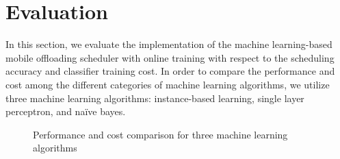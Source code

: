 \documentclass[10pt, conference, compsocconf]{IEEEtran}
\begin{document}
{\section{Evaluation}
%
In this section, we evaluate the implementation of the machine
learning-based mobile offloading scheduler with online training with
respect to the scheduling accuracy and classifier training cost.
%
In order to compare the performance and cost among the different
categories of machine learning algorithms, we utilize three machine
learning algorithms: instance-based learning, single layer perceptron,
and na\"{i}ve bayes.
%
\begin{figure}[ht]
\centering
{}
\caption{Performance and cost comparison for three machine learning
algorithms}
\end{figure}
%
}
\end{document}
